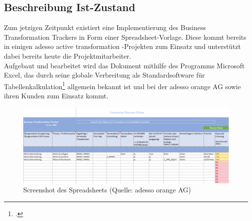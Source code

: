 \subsection{Beschreibung Ist-Zustand}
Zum jetzigen Zeitpunkt existiert eine Implementierung des Business Transformation Trackers in Form einer Spreadsheet-Vorlage. Diese kommt bereits in einigen adesso active transformation -Projekten zum Einsatz und unterstützt dabei bereits heute die Projektmitarbeiter.\\ Aufgebaut und bearbeitet wird das Dokument mithilfe des Programms Microsoft Excel, das durch seine globale Verbreitung als Standardsoftware für Tabellenkalkulation\footcite[Vgl.][]{wiki-excel} allgemein bekannt ist und bei der adesso orange AG sowie ihren Kunden zum Einsatz kommt.\\
\begin{figure}[h!]
    \centering
    \includegraphics[scale=0.45]{./Bilder/BTT-Ist.png}
    \caption[Istzustand BTT]{Screenshot des Spreadsheets (Quelle: adesso orange AG)}
\end{figure}
